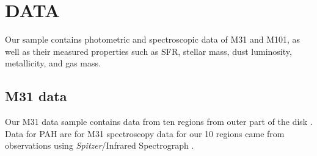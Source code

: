 
\section{DATA}
Our sample contains photometric and spectroscopic data of M31 and M101, as well as their measured properties such as SFR, stellar mass, dust luminosity, metallicity, and gas mass.    
    \subsection{M31 data}
     Our M31 data sample contains data from ten regions from outer part of the disk . Data for PAH are for M31 spectroscopy data for our 10 regions came from observations using {\it Spitzer}/Infrared Spectrograph \citep{Dim15}. \cite{Dim15}   
     
